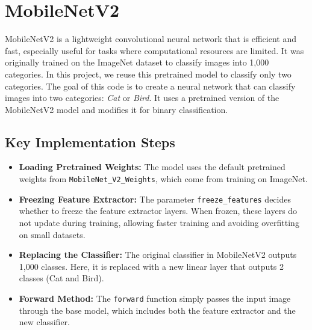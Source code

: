 \section{MobileNetV2}
MobileNetV2 is a lightweight convolutional neural network that is efficient and fast, especially useful for tasks where computational resources are limited. 
It was originally trained on the ImageNet dataset to classify images into 1,000 categories. In this project, we reuse this pretrained model to classify only two categories.
The goal of this code is to create a neural network that can classify images into two categories: \textit{Cat} or \textit{Bird}. 
It uses a pretrained version of the MobileNetV2 model and modifies it for binary classification.

\subsection{Key Implementation Steps}
\begin{itemize}
    \item \textbf{Loading Pretrained Weights:} The model uses the default pretrained weights from \texttt{MobileNet\_V2\_Weights}, which come from training on ImageNet.
    
    \item \textbf{Freezing Feature Extractor:} The parameter \texttt{freeze\_features} decides whether to freeze the feature extractor layers. When frozen, these layers do not update during training, allowing faster training and avoiding overfitting on small datasets.

    \item \textbf{Replacing the Classifier:} The original classifier in MobileNetV2 outputs 1,000 classes. Here, it is replaced with a new linear layer that outputs 2 classes (Cat and Bird).

    \item \textbf{Forward Method:} The \texttt{forward} function simply passes the input image through the base model, which includes both the feature extractor and the new classifier.
\end{itemize}


